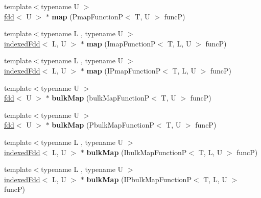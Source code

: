 \begin{DoxyCompactItemize}
\item 
\hypertarget{classfaster_1_1fdd_a2cfde53328f21d2ffba58dde111219ff}{}{\footnotesize template$<$typename U $>$ }\\\hyperlink{classfaster_1_1fdd}{fdd}$<$ U $>$ $\ast$ {\bfseries map} (Pmap\+Function\+P$<$ T, U $>$ func\+P)\label{classfaster_1_1fdd_a2cfde53328f21d2ffba58dde111219ff}

\item 
\hypertarget{classfaster_1_1fdd_a17066a9f6526c2c630d730727c6b1b51}{}{\footnotesize template$<$typename L , typename U $>$ }\\\hyperlink{classfaster_1_1indexedFdd}{indexed\+Fdd}$<$ L, U $>$ $\ast$ {\bfseries map} (Imap\+Function\+P$<$ T, L, U $>$ func\+P)\label{classfaster_1_1fdd_a17066a9f6526c2c630d730727c6b1b51}

\item 
\hypertarget{classfaster_1_1fdd_a61ce985503e31026794696c6c6db20b8}{}{\footnotesize template$<$typename L , typename U $>$ }\\\hyperlink{classfaster_1_1indexedFdd}{indexed\+Fdd}$<$ L, U $>$ $\ast$ {\bfseries map} (I\+Pmap\+Function\+P$<$ T, L, U $>$ func\+P)\label{classfaster_1_1fdd_a61ce985503e31026794696c6c6db20b8}

\item 
\hypertarget{classfaster_1_1fdd_a0b4b82535fe1d2746973ce4e203d619f}{}{\footnotesize template$<$typename U $>$ }\\\hyperlink{classfaster_1_1fdd}{fdd}$<$ U $>$ $\ast$ {\bfseries bulk\+Map} (bulk\+Map\+Function\+P$<$ T, U $>$ func\+P)\label{classfaster_1_1fdd_a0b4b82535fe1d2746973ce4e203d619f}

\item 
\hypertarget{classfaster_1_1fdd_a72e07b032ee97aeed0261a20769720a7}{}{\footnotesize template$<$typename U $>$ }\\\hyperlink{classfaster_1_1fdd}{fdd}$<$ U $>$ $\ast$ {\bfseries bulk\+Map} (Pbulk\+Map\+Function\+P$<$ T, U $>$ func\+P)\label{classfaster_1_1fdd_a72e07b032ee97aeed0261a20769720a7}

\item 
\hypertarget{classfaster_1_1fdd_a97ad1e63823abe30de230da1456481d4}{}{\footnotesize template$<$typename L , typename U $>$ }\\\hyperlink{classfaster_1_1indexedFdd}{indexed\+Fdd}$<$ L, U $>$ $\ast$ {\bfseries bulk\+Map} (Ibulk\+Map\+Function\+P$<$ T, L, U $>$ func\+P)\label{classfaster_1_1fdd_a97ad1e63823abe30de230da1456481d4}

\item 
\hypertarget{classfaster_1_1fdd_abfd585e52364a7be20125aa25c0ab141}{}{\footnotesize template$<$typename L , typename U $>$ }\\\hyperlink{classfaster_1_1indexedFdd}{indexed\+Fdd}$<$ L, U $>$ $\ast$ {\bfseries bulk\+Map} (I\+Pbulk\+Map\+Function\+P$<$ T, L, U $>$ func\+P)\label{classfaster_1_1fdd_abfd585e52364a7be20125aa25c0ab141}


\end{DoxyCompactItemize}
